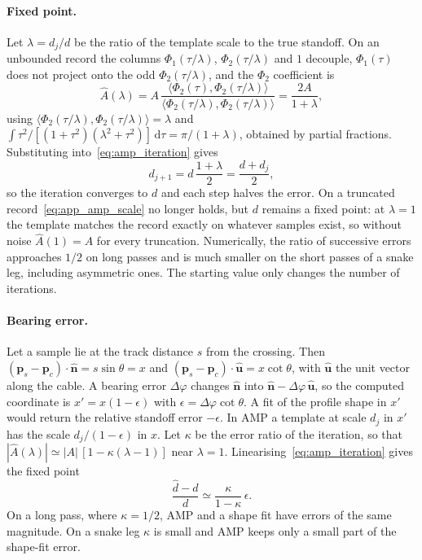 \paragraph{Fixed point.}
Let $\lambda = d_j/d$ be the ratio of the template scale to the true standoff. On an unbounded record the columns $\Phi_1(\tau/\lambda)$, $\Phi_2(\tau/\lambda)$ and $1$ decouple, $\Phi_1(\tau)$ does not project onto the odd $\Phi_2(\tau/\lambda)$, and the $\Phi_2$ coefficient is
\begin{equation}
\hat{A}(\lambda) = A\,\frac{\langle \Phi_2(\tau), \Phi_2(\tau/\lambda) \rangle}{\langle \Phi_2(\tau/\lambda), \Phi_2(\tau/\lambda) \rangle} = \frac{2A}{1 + \lambda},
\label{eq:app_amp_scale}
\end{equation}
using $\langle \Phi_2(\tau/\lambda), \Phi_2(\tau/\lambda) \rangle = \lambda$ and $\int \tau^2/[(1 + \tau^2)(\lambda^2 + \tau^2)]\,\mathrm{d}\tau = \pi/(1 + \lambda)$, obtained by partial fractions. Substituting into~\eqref{eq:amp_iteration} gives
\begin{equation}
d_{j+1} = d\,\frac{1 + \lambda}{2} = \frac{d + d_j}{2},
\label{eq:app_amp_contraction}
\end{equation}
so the iteration converges to $d$ and each step halves the error. On a truncated record~\eqref{eq:app_amp_scale} no longer holds, but $d$ remains a fixed point: at $\lambda = 1$ the template matches the record exactly on whatever samples exist, so without noise $\hat{A}(1) = A$ for every truncation. Numerically, the ratio of successive errors approaches $1/2$ on long passes and is much smaller on the short passes of a snake leg, including asymmetric ones. The starting value only changes the number of iterations.

\paragraph{Bearing error.}
Let a sample lie at the track distance $s$ from the crossing. Then $(\mathbf{p}_s - \mathbf{p}_c)\cdot\hat{\mathbf{n}} = s\sin\theta = x$ and $(\mathbf{p}_s - \mathbf{p}_c)\cdot\hat{\mathbf{u}} = x\cot\theta$, with $\hat{\mathbf{u}}$ the unit vector along the cable. A bearing error $\Delta\varphi$ changes $\hat{\mathbf{n}}$ into $\hat{\mathbf{n}} - \Delta\varphi\,\hat{\mathbf{u}}$, so the computed coordinate is $x' = x(1 - \epsilon)$ with $\epsilon = \Delta\varphi\cot\theta$. A fit of the profile shape in $x'$ would return the relative standoff error $-\epsilon$. In AMP a template at scale $d_j$ in $x'$ has the scale $d_j/(1 - \epsilon)$ in $x$. Let $\kappa$ be the error ratio of the iteration, so that $|\hat{A}(\lambda)| \simeq |A|\,[1 - \kappa(\lambda - 1)]$ near $\lambda = 1$. Linearising~\eqref{eq:amp_iteration} gives the fixed point
\begin{equation}
\frac{\hat{d} - d}{d} \simeq \frac{\kappa}{1 - \kappa}\,\epsilon.
\label{eq:app_amp_bearing}
\end{equation}
On a long pass, where $\kappa = 1/2$, AMP and a shape fit have errors of the same magnitude. On a snake leg $\kappa$ is small and AMP keeps only a small part of the shape-fit error.

